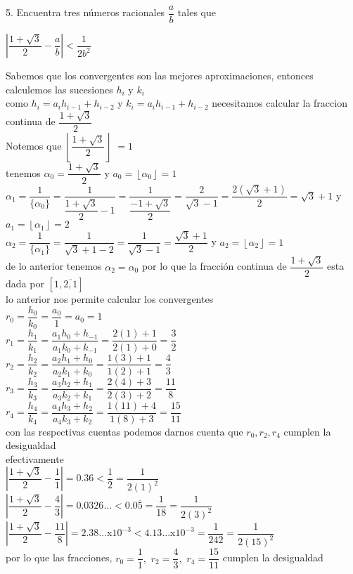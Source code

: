 \documentclass[11pt, article]{memoir}
\begin{document}
5. Encuentra tres números racionales $\dfrac{a}{b}$ tales que\\
\begin{center}
$\left|\dfrac{1+\sqrt{3}}{2}-\dfrac{a}{b}\right|< \dfrac{1}{2b^{2}}$\\
\end{center}

Sabemos que los convergentes son las mejores aproximaciones, entonces calculemos las sucesiones $h_{i}$ y $k_{i}$\\
como $h_{i}=a_{i}h_{i-1}+h_{i-2}$ y $k_{i}=a_{i}h_{i-1}+h_{i-2}$ necesitamos calcular la fraccion continua de $\dfrac{1+\sqrt{3}}{2}$\\
Notemos que $\left\lfloor \dfrac{1+\sqrt{3}}{2} \right\rfloor$ $=1$\\
tenemos $\alpha_{0}=\dfrac{1+\sqrt{3}}{2}$ y $a_{0}=\left\lfloor \alpha_{0} \right\rfloor=1$\\
${\alpha_{1}}=\dfrac{1}{\{\alpha_{0}\}}=\dfrac{1}{\dfrac{1+\sqrt{3}}{2}-1}=\dfrac{1}{\dfrac{-1+\sqrt{3}}{2}}=\dfrac{2}{\sqrt{3}-1}=\dfrac{2(\sqrt{3}+1)}{2}=\sqrt{3}+1$ y $a_{1}=\left\lfloor \alpha_{1} \right\rfloor=2$\\
${\alpha_{2}}=\dfrac{1}{\{\alpha_{1}\}}=\dfrac{1}{\sqrt{3}+1-2}=\dfrac{1}{\sqrt{3}-1}=\dfrac{\sqrt{3}+1}{2}$ y  $a_{2}=\left\lfloor \alpha_{2} \right\rfloor=1$\\
de lo anterior tenemos $\alpha_{2}=\alpha_{0}$ por lo que la fracción continua de $\dfrac{1+\sqrt{3}}{2}$ esta dada por $[1,\overline{2,1}]$\\
lo anterior nos permite calcular los convergentes\\
$r_{0}=\dfrac{h_{0}}{k_{0}}=\dfrac{a_{0}}{1}=a_{0}=1$\\
$r_{1}=\dfrac{h_{1}}{k_{1}}=\dfrac{a_{1}h_{0}+h_{-1}}{a_{1}k_{0}+k_{-1}}=\dfrac{2(1)+1}{2(1)+0}=\dfrac{3}{2}$\\
$r_{2}=\dfrac{h_{2}}{k_{2}}=\dfrac{a_{2}h_{1}+h_{0}}{a_{2}k_{1}+k_{0}}=\dfrac{1(3)+1}{1(2)+1}=\dfrac{4}{3}$\\
$r_{3}=\dfrac{h_{3}}{k_{3}}=\dfrac{a_{3}h_{2}+h_{1}}{a_{3}k_{2}+k_{1}}=\dfrac{2(4)+3}{2(3)+2}=\dfrac{11}{8}$\\
$r_{4}=\dfrac{h_{4}}{k_{4}}=\dfrac{a_{4}h_{3}+h_{2}}{a_{4}k_{3}+k_{2}}=\dfrac{1(11)+4}{1(8)+3}=\dfrac{15}{11}$\\
con las respectivas cuentas podemos darnos cuenta que $r_{0}, r_{2}, r_{4}$ cumplen la desigualdad\\
efectivamente\\
$\left|\dfrac{1+\sqrt{3}}{2}-\dfrac{1}{1}\right|=0.36<\dfrac{1}{2}=\dfrac{1}{2(1)^{2}}$\\
$\left|\dfrac{1+\sqrt{3}}{2}-\dfrac{4}{3}\right|=0.0326...<0.0\overline{5}=\dfrac{1}{18}=\dfrac{1}{2(3)^{2}}$\\
$\left|\dfrac{1+\sqrt{3}}{2}-\dfrac{11}{8}\right|=2.38...$x$10^{-3}<4.13...$x$10^{-3}=\dfrac{1}{242}=\dfrac{1}{2(15)^{2}}$\\
por lo que las fracciones, $r_{0}=\dfrac{1}{1},$ $ r_{2}=\dfrac{4}{3}, $ $r_{4}=\dfrac{15}{11}$ cumplen la desigualdad \\
\end{document}
